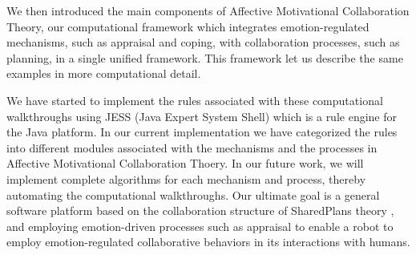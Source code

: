 We then introduced the main components of Affective Motivational Collaboration
Theory, our computational framework which integrates emotion-regulated
mechanisms, such as appraisal and coping, with collaboration processes, such as
planning, in a single unified framework. This framework let us describe the same
examples in more computational detail.

We have started to implement the rules associated with these computational
walkthroughs using JESS (Java Expert System Shell) which is a rule engine for
the Java platform. In our current implementation we have categorized the rules
into different modules associated with the mechanisms and the processes in
Affective Motivational Collaboration Thoery. In our future work, we will
implement complete algorithms for each mechanism and process, thereby automating
the computational walkthroughs. Our ultimate goal is a general software platform
based on the collaboration structure of SharedPlans theory
\cite{grosz:discourse-structure}, and employing emotion-driven processes such as
appraisal \cite{marsella:ema-process-model} to enable a robot to employ
emotion-regulated collaborative behaviors in its interactions with humans.




%
%





